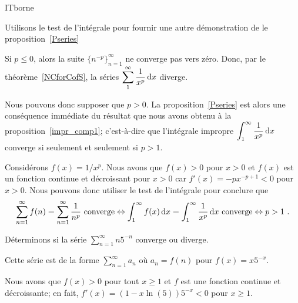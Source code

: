 {
{ITborne}

\begin{egg}
Utilisons le test de l'intégrale pour fournir une autre
démonstration de le proposition~\ref{Pseries}

Si $p \leq 0$, alors la suite $\displaystyle \{n^{-p}\}_{n=1}^\infty$
ne converge pas vers zéro.  Donc, par le théorème~\ref{NCforCofS},
la séries $\displaystyle \sum_1^\infty \frac{1}{x^p} \,\mathrm{d}x$
diverge.

Nous pouvons donc supposer que $p>0$.  La proposition~\ref{Pseries} est alors
une conséquence immédiate du résultat que nous avons obtenu à
la proposition~\ref{impr_comp1}; c'est-à-dire que l'intégrale impropre
$\displaystyle \int_1^\infty \frac{1}{x^p} \,\mathrm{d}x$ converge si seulement et
seulement si $p>1$.

Considérons $f(x) = 1/x^p$.  Nous avons que $f(x)>0$ pour $x>0$ et
$f(x)$ est un fonction continue et décroissant pour $x>0$ car
$f'(x) = -p x^{-p+1} <0$ pour $x>0$.  Nous pouvons donc utiliser le test de
l'intégrale pour conclure que
\[
\sum_{n=1}^\infty f(n)= \sum_{n=1}^\infty \frac{1}{n^p}
\text{ converge} \Leftrightarrow 
\int_1^\infty f(x) \,\mathrm{d}x = \int_1^\infty \frac{1}{x^p} \,\mathrm{d}x
\text{ converge} \Leftrightarrow
p>1 \ .
\]
\end{egg}

\begin{egg}
Déterminons si la série $\displaystyle \sum_{n=1}^\infty n 5^{-n}$
converge ou diverge.

Cette série est de la forme $\displaystyle \sum_{n=1}^\infty a_n$ où
$a_n = f(n)$ pour $f(x) = x 5^{-x}$.

Nous avons que $f(x) > 0$ pour tout $x\geq 1$ et $f$ est une fonction
continue et décroissante; en fait,
$f'(x) = (1 - x\ln(5))5^{-x} < 0$ pour $x\geq 1$.


\end{egg}}
